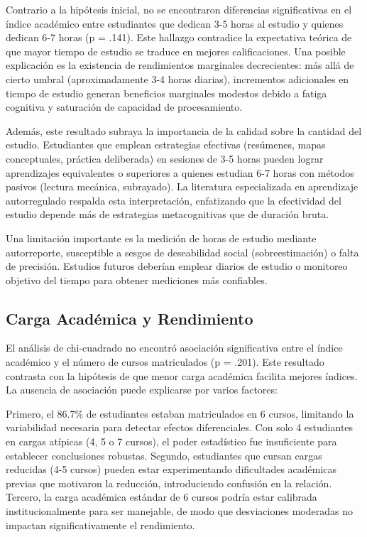 \documentclass[
  stu,
  floatsintext,
  longtable,
  a4paper,
  nolmodern,
  notxfonts,
  notimes,
  12pt,
  colorlinks=true,linkcolor=blue,citecolor=blue,urlcolor=blue]{apa7}
\begin{document}
Contrario a la hipótesis inicial, no se encontraron diferencias
significativas en el índice académico entre estudiantes que dedican 3-5
horas al estudio y quienes dedican 6-7 horas (p = .141). Este hallazgo
contradice la expectativa teórica de que mayor tiempo de estudio se
traduce en mejores calificaciones. Una posible explicación es la
existencia de rendimientos marginales decrecientes: más allá de cierto
umbral (aproximadamente 3-4 horas diarias), incrementos adicionales en
tiempo de estudio generan beneficios marginales modestos debido a fatiga
cognitiva y saturación de capacidad de procesamiento.

Además, este resultado subraya la importancia de la calidad sobre la
cantidad del estudio. Estudiantes que emplean estrategias efectivas
(resúmenes, mapas conceptuales, práctica deliberada) en sesiones de 3-5
horas pueden lograr aprendizajes equivalentes o superiores a quienes
estudian 6-7 horas con métodos pasivos (lectura mecánica, subrayado). La
literatura especializada en aprendizaje autorregulado respalda esta
interpretación, enfatizando que la efectividad del estudio depende más
de estrategias metacognitivas que de duración bruta.

Una limitación importante es la medición de horas de estudio mediante
autorreporte, susceptible a sesgos de deseabilidad social
(sobreestimación) o falta de precisión. Estudios futuros deberían
emplear diarios de estudio o monitoreo objetivo del tiempo para obtener
mediciones más confiables.

\subsection{Carga Académica y
Rendimiento}\label{carga-acaduxe9mica-y-rendimiento}

El análisis de chi-cuadrado no encontró asociación significativa entre
el índice académico y el número de cursos matriculados (p = .201). Este
resultado contrasta con la hipótesis de que menor carga académica
facilita mejores índices. La ausencia de asociación puede explicarse por
varios factores:

Primero, el 86.7\% de estudiantes estaban matriculados en 6 cursos,
limitando la variabilidad necesaria para detectar efectos diferenciales.
Con solo 4 estudiantes en cargas atípicas (4, 5 o 7 cursos), el poder
estadístico fue insuficiente para establecer conclusiones robustas.
Segundo, estudiantes que cursan cargas reducidas (4-5 cursos) pueden
estar experimentando dificultades académicas previas que motivaron la
reducción, introduciendo confusión en la relación. Tercero, la carga
académica estándar de 6 cursos podría estar calibrada institucionalmente
para ser manejable, de modo que desviaciones moderadas no impactan
significativamente el rendimiento.
\end{document}
